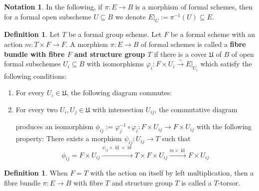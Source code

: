\documentclass[10pt,oneside]{amsart}
\theoremstyle{definition}
\newtheorem{definition}[theorem]{Definition}
\newtheorem{notation}[theorem]{Notation}
\begin{document}
	\begin{notation}
		In the following, if $\pi:E\rightarrow B$ is a morphism of formal schemes, then for a formal open subscheme $U\subseteq B$ we denote $E|_U:=\pi^{-1}(U)\subseteq E$.
	\end{notation}
	\begin{definition}\label{definition principal T-bundle}
		Let $T$ be a formal group scheme. Let $F$ be a formal scheme with an action $m:T\times F\rightarrow F$.
		A morphism $\pi:E\rightarrow B$ of formal schemes is called a \textbf{fibre bundle with fibre $F$ and structure group $T$} if there is a cover $\mathfrak U$ of $B$ of open formal subschemes $U_i\subseteq B$ with isomorphisms $\varphi_i:F\times U_i \xrightarrow{\sim} E|_{U_i}$ which satisfy the following conditions:
		\begin{enumerate}[label=(\alph*)]
			\item For every $U_i\in \mathfrak U$, the following diagram commutes:
			\begin{center}
			\end{center}
			\item For every two $U_i,U_j\in \mathfrak U$ with intersection $U_{ij}$, the commutative diagram
			\begin{center}
			\end{center}
			produces an isomorphism $\phi_{ij}:=\varphi_j^{-1}\circ\varphi_i: F\times U_{ij}\rightarrow F\times U_{ij}$ with the following property: There exists a morphism $\psi_{ij}:U_{ij}\rightarrow T$ such that
			\[\phi_{ij}=F\times U_{ij} \xrightarrow{\psi_{ij}\times \operatorname{id}\times\operatorname{id}} T\times F\times U_{ij}\xrightarrow{m\times \operatorname{id}} F\times U_{ij}\]
		\end{enumerate}
	\end{definition}
	\begin{definition}
		When $F=T$ with the action on itself by left multiplication, then a fibre bundle $\pi:E\rightarrow B$ with fibre $T$ and structure group $T$ is called a $T$-torsor.
	\end{definition}
	
\end{document}
